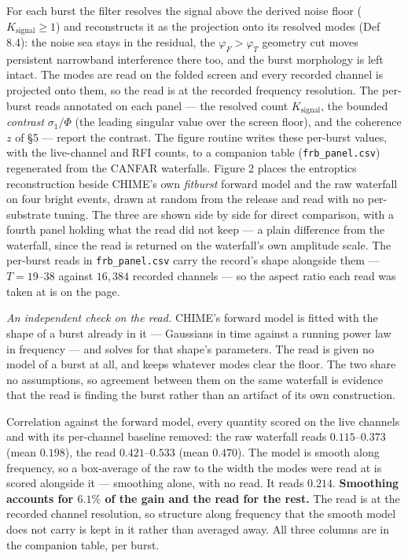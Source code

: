 \documentclass[10pt,letterpaper,twocolumn]{article}
\begin{document}
For each burst the filter resolves the signal above the derived noise floor (\(K_{\mathrm{signal}}\ge 1\)) and reconstructs it as the projection onto its resolved modes (Def 8.4): the noise sea stays in the residual, the \(\varphi_F>\varphi_T\) geometry cut moves persistent narrowband interference there too, and the burst morphology is left intact. The modes are read on the folded screen and every recorded channel is projected onto them, so the read is at the recorded frequency resolution. The per-burst reads annotated on each panel --- the resolved count \(K_{\mathrm{signal}}\), the bounded \emph{contrast} \(\sigma_1/\Phi\) (the leading singular value over the screen floor), and the coherence \(z\) of §5 --- report the contrast. The figure routine writes these per-burst values, with the live-channel and RFI counts, to a companion table (\texttt{frb\_\allowbreak{}panel.\allowbreak{}csv}) regenerated from the CANFAR waterfalls. Figure 2 places the entroptics reconstruction beside CHIME's own \emph{fitburst} forward model and the raw waterfall on four bright events, drawn at random from the release and read with no per-substrate tuning. The three are shown side by side for direct comparison, with a fourth panel holding what the read did not keep --- a plain difference from the waterfall, since the read is returned on the waterfall's own amplitude scale. The per-burst reads in \texttt{frb\_\allowbreak{}panel.\allowbreak{}csv} carry the record's shape alongside them --- \(T=19\)--\(38\) against \(16{,}384\) recorded channels --- so the aspect ratio each read was taken at is on the page.

\emph{An independent check on the read.} CHIME's forward model is fitted with the shape of a burst already in it --- Gaussians in time against a running power law in frequency --- and solves for that shape's parameters. The read is given no model of a burst at all, and keeps whatever modes clear the floor. The two share no assumptions, so agreement between them on the same waterfall is evidence that the read is finding the burst rather than an artifact of its own construction.

Correlation against the forward model, every quantity scored on the live channels and with its per-channel baseline removed: the raw waterfall reads \(0.115\)--\(0.373\) (mean \(0.198\)), the read \(0.421\)--\(0.533\) (mean \(0.470\)). The model is smooth along frequency, so a box-average of the raw to the width the modes were read at is scored alongside it --- smoothing alone, with no read. It reads \(0.214\). \textbf{Smoothing accounts for \(6.1\%\) of the gain and the read for the rest.} The read is at the recorded channel resolution, so structure along frequency that the smooth model does not carry is kept in it rather than averaged away. All three columns are in the companion table, per burst.
\end{document}
